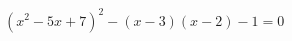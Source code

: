 \begin{ex}[type=equation]
	\begin{condition}
		\( (x^2-5x+7)^2-(x-3)(x-2)-1=0 \)
	\end{condition}
\end{ex}